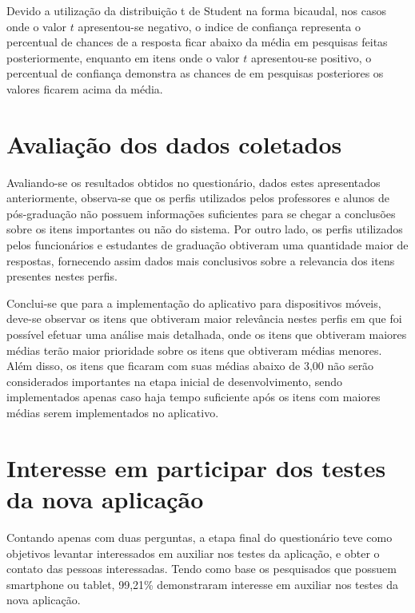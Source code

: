 Devido a utilização da  distribuição t de Student na forma bicaudal, nos casos onde o valor $t$ apresentou-se negativo, o indice de confiança representa o percentual de chances de a resposta ficar abaixo da média em pesquisas feitas posteriormente, enquanto em itens onde o valor $t$ apresentou-se positivo, o percentual de confiança demonstra as chances de em pesquisas posteriores os valores ficarem acima da média.

\section{Avaliação dos dados coletados}
Avaliando-se os resultados obtidos no questionário, dados estes apresentados anteriormente, observa-se que os perfis utilizados pelos professores e alunos de pós-graduação não possuem informações suficientes para se chegar a conclusões sobre os itens importantes ou não do sistema.
Por outro lado, os perfis utilizados pelos funcionários e estudantes de graduação obtiveram uma quantidade maior de respostas, fornecendo assim dados mais conclusivos sobre a relevancia dos itens presentes nestes perfis.

Conclui-se que para a implementação do aplicativo para dispositivos móveis, deve-se observar os itens que obtiveram maior relevância nestes perfis em que foi possível efetuar uma análise mais detalhada, onde os itens que obtiveram maiores médias terão maior prioridade sobre os itens que obtiveram médias menores. Além disso, os itens que ficaram com suas médias abaixo de 3,00 não serão considerados importantes na etapa inicial de desenvolvimento, sendo implementados apenas caso haja tempo suficiente após os itens com maiores médias serem implementados no aplicativo.

\section{Interesse em participar dos testes da nova aplicação}
Contando apenas com duas perguntas, a etapa final do questionário teve como objetivos levantar interessados em auxiliar nos testes da aplicação, e obter o contato das pessoas interessadas. Tendo como base os pesquisados que possuem smartphone ou tablet, 99,21\% demonstraram interesse em auxiliar nos testes da nova aplicação.

